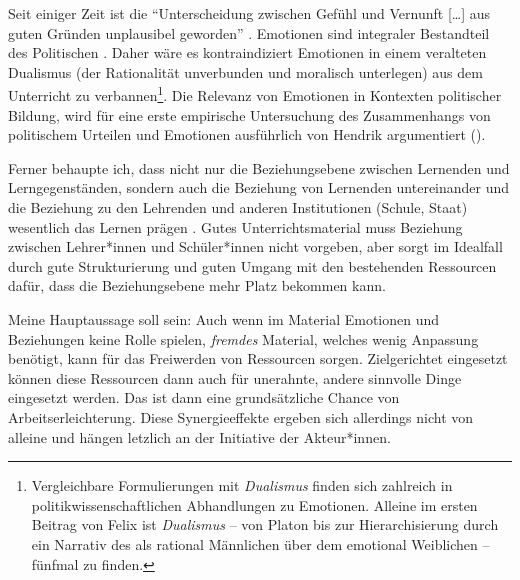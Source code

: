 Seit einiger Zeit ist die \enquote{Unterscheidung zwischen Gefühl und Vernunft [\dots] aus guten
Gründen unplausibel geworden} \autocite[][5]{Heidenreich.2012}. Emotionen sind integraler Bestandteil des Politischen \autocite[\gls{zb}][]{Heidenreich.2012a}. Daher wäre es kontraindiziert Emotionen in einem veralteten Dualismus (der Rationalität unverbunden und moralisch unterlegen) aus dem Unterricht zu verbannen\footnote{
    Vergleichbare Formulierungen mit \emph{Dualismus} finden sich zahlreich in politikwissenschaftlichen Abhandlungen zu Emotionen. Alleine im ersten Beitrag von Felix \textcite[9, 16, 17, 19, 25]{Heidenreich.2012a} ist \emph{Dualismus} -- von Platon bis zur Hierarchisierung durch ein Narrativ des als rational Männlichen über dem emotional Weiblichen  -- fünfmal zu finden. 
}. Die Relevanz von Emotionen in Kontexten politischer Bildung, wird für eine erste empirische Untersuchung des Zusammenhangs von politischem Urteilen und Emotionen ausführlich von Hendrik \citeauthor{Schroder.2020} argumentiert (\citeyear[zu Emotionen und Politik \gls{zb} die Kapitel 1.3.3, 1.3.4, 6 \& 7]{Schroder.2020}).  

Ferner behaupte ich, dass nicht nur die Beziehungsebene zwischen Lernenden und Lerngegenständen, sondern auch die Beziehung von Lernenden untereinander und die Beziehung zu den Lehrenden und anderen Institutionen (Schule, Staat) wesentlich das Lernen prägen \autocites(\gls{vgl} zu Beziehung \gls{zb})(){Kunkler2011}{Stratmann2021}.  
Gutes Unterrichtsmaterial muss Beziehung zwischen Lehrer*innen und Schüler*innen nicht vorgeben, aber sorgt im Idealfall durch gute Strukturierung und guten Umgang mit den bestehenden Ressourcen dafür, dass die Beziehungsebene mehr Platz bekommen kann.
\bigskip

Meine Hauptaussage soll sein: Auch wenn im Material Emotionen und Beziehungen keine Rolle spielen, \emph{fremdes} Material, welches wenig Anpassung benötigt, kann für das Freiwerden von Ressourcen sorgen. Zielgerichtet eingesetzt können diese Ressourcen dann auch für unerahnte, andere sinnvolle Dinge eingesetzt werden.
Das ist dann eine grundsätzliche Chance von Arbeitserleichterung. Diese Synergieeffekte ergeben sich allerdings nicht von alleine und hängen letzlich an der Initiative der Akteur*innen. 





